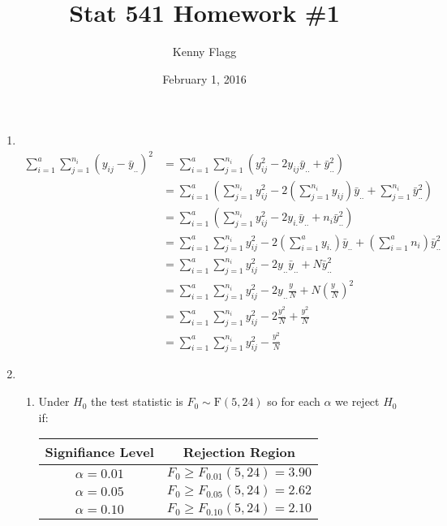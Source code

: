 \documentclass[11pt]{article}
\title{Stat 541 Homework \#1}
\author{Kenny Flagg}
\date{February 1, 2016}
\begin{document}
\maketitle

\begin{enumerate}

\item %
~\vspace{-33pt}
\begin{align*}
\sum_{i=1}^a\sum_{j=1}^{n_i}\left(y_{ij}-\bar{y}_{..}\right)^2
&=\sum_{i=1}^a\sum_{j=1}^{n_i}\left(y_{ij}^2-2y_{ij}\bar{y}_{..}+\bar{y}_{..}^2\right)\\
&=\sum_{i=1}^a\left(\sum_{j=1}^{n_i}y_{ij}^2-2\left(\sum_{j=1}^{n_i}y_{ij}\right)\bar{y}_{..}+\sum_{j=1}^{n_i}\bar{y}_{..}^2\right)\\
&=\sum_{i=1}^a\left(\sum_{j=1}^{n_i}y_{ij}^2-2y_{i.}\bar{y}_{..}+n_i\bar{y}_{..}^2\right)\\
&=\sum_{i=1}^a\sum_{j=1}^{n_i}y_{ij}^2-2\left(\sum_{i=1}^ay_{i.}\right)\bar{y}_{..}+\left(\sum_{i=1}^an_i\right)\bar{y}_{..}^2\\
&=\sum_{i=1}^a\sum_{j=1}^{n_i}y_{ij}^2-2y_{..}\bar{y}_{..}+N\bar{y}_{..}^2\\
&=\sum_{i=1}^a\sum_{j=1}^{n_i}y_{ij}^2-2y_{..}\frac{{y}_{..}}{N}+N\left(\frac{{y}_{..}}{N}\right)^2\\
&=\sum_{i=1}^a\sum_{j=1}^{n_i}y_{ij}^2-2\frac{{y}_{..}^2}{N}+\frac{{y}_{..}^2}{N}\\
&=\sum_{i=1}^a\sum_{j=1}^{n_i}y_{ij}^2-\frac{{y}_{..}^2}{N}
\end{align*}

\pagebreak
\item %

\begin{enumerate}

\item %
Under \(H_0\) the test statistic is \(F_0\sim\mathrm{F}(5, 24)\) so for each \(\alpha\) we reject \(H_0\) if:
\begin{center}\begin{tabular}{|c|c|}
\hline
Signifiance Level & Rejection Region \\
\hline
\(\alpha=0.01\) &  \(F_0\geq F_{0.01}(5, 24)=3.90\) \\
\(\alpha=0.05\) & \(F_0\geq F_{0.05}(5, 24)=2.62\) \\
\(\alpha=0.10\) & \(F_0\geq F_{0.10}(5, 24)=2.10\) \\
\hline
\end{tabular}\end{center}


\end{enumerate}
\end{enumerate}
\end{document}

